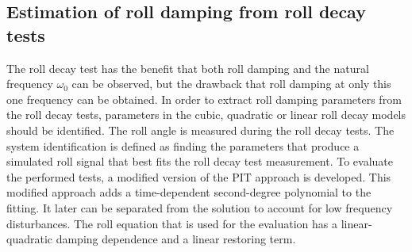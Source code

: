 \subsection{Estimation of roll damping from roll decay tests}
\label{se:experimental_estimation}
The roll decay test has the benefit that both roll damping and the natural frequency $\omega_0$ can be observed, but the drawback that roll damping at only this one frequency can be obtained. In order to extract roll damping parameters from the roll decay tests, parameters in the cubic, quadratic or linear roll decay models should be identified. The roll angle is measured during the roll decay tests. The system identification is defined as finding the parameters that produce a simulated roll signal that best fits the roll decay test measurement. 
To evaluate the performed tests, a modified version of the PIT approach is developed. This modified approach adds a time-dependent second-degree polynomial to the fitting. It later can be separated from the solution to account for low frequency disturbances. The roll equation that is used for the evaluation has a linear-quadratic damping dependence and a linear restoring term. 



%
%
%
%




